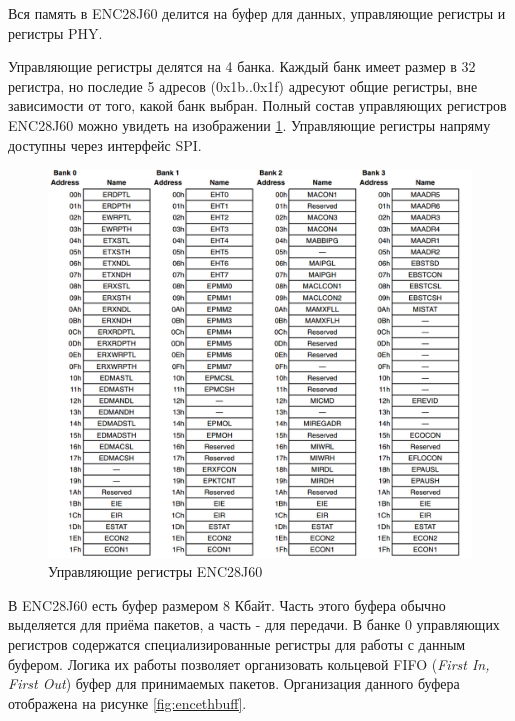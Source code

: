 Вся память в ENC28J60 делится на буфер для данных, управляющие регистры и регистры PHY.

Управляющие регистры делятся на 4 банка. Каждый банк имеет размер в 32 регистра, но последие 5 адресов (0x1b..0x1f) адресуют общие регистры, вне зависимости от того, какой банк выбран. Полный состав управляющих регистров ENC28J60 можно увидеть на изображении \ref{fig:encregmap}. Управляющие регистры напряму доступны через интерфейс SPI. 

\begin{figure}[H]
	\centering
		\includegraphics[scale=0.45]{img/encregmap.png}
	\caption{Управляющие регистры ENC28J60\label{fig:encregmap} \cite{enc28j60datasheet}}
\end{figure}

В ENC28J60 есть буфер размером 8 Кбайт. Часть этого буфера обычно выделяется для приёма пакетов, а часть - для передачи. В банке 0 управляющих регистров содержатся специализированные регистры для работы с данным буфером. Логика их работы позволяет организовать кольцевой FIFO (\textit{First In, First Out}) буфер для принимаемых пакетов. Организация данного буфера отображена на рисунке \ref{fig:encethbuff}.

